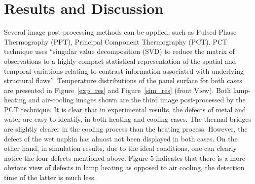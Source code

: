 \documentclass{tQRT2e}
\begin{document}
\section{Results and Discussion}
Several image post-processing methods can be applied, such as Pulsed Phase Thermography (PPT)\cite{Maldague1996}, Principal Component Thermography (PCT)\cite{Rajic2002}. PCT technique uses “singular value decomposition (SVD) to reduce the matrix of observations to a highly compact statistical representation of the spatial and temporal variations relating to contrast information associated with underlying structural flaws”. Temperature distributions of the panel surface for both cases are presented in Figure~\ref{exp_res} and Figure~\ref{sim_res} (front View). Both lamp-heating and air-cooling images shown are the third image post-processed by the PCT technique. It is clear that in experimental results, the defects of metal and water are easy to identify, in both heating and cooling cases. The thermal bridges are slightly clearer in the cooling process than the heating process. However, the defect of the wet napkin has almost not been displayed in both cases. On the other hand, in simulation results, due to the ideal conditions, one can clearly notice the four defects mentioned above. Figure 5 indicates that there is a more obvious view of defects in lamp heating as opposed to air cooling, the detection time of the latter is much less.
\end{document}

